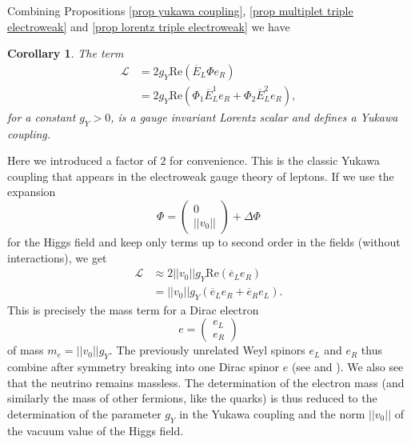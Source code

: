 \documentclass[12pt]{amsart}
\newtheorem{cor}[thm]{Corollary}
\theoremstyle{definition}
\theoremstyle{remark}
\numberwithin{equation}{section}
\begin{document}
Combining Propositions \ref{prop yukawa coupling}, \ref{prop multiplet triple electroweak} and \ref{prop lorentz triple electroweak} we have
\begin{cor}The term
\begin{align*}
\mathcal{L}&=2 g_Y\mathrm{Re}(\overline{E}_L\Phi e_R)\\
&=2g_Y\mathrm{Re}(\Phi_1\overline{E}^1_Le_R+\Phi_2\overline{E}^2_Le_R),
\end{align*}
for a constant $g_Y>0$, is a gauge invariant Lorentz scalar and defines a Yukawa coupling.
\end{cor}
Here we introduced a factor of $2$ for convenience. This is the classic Yukawa coupling that appears in the electroweak gauge theory of leptons. If we use the expansion
\begin{equation*}
\Phi=\left(\begin{array}{c} 0 \\ ||v_0|| \end{array}\right)+\Delta\Phi
\end{equation*}
for the Higgs field and keep only terms up to second order in the fields (without interactions), we get
\begin{align*}
\mathcal{L}&\approx 2||v_0||g_Y\mathrm{Re}(\overline{e}_Le_R)\\
&=||v_0||g_Y(\overline{e}_Le_R+\overline{e}_Re_L).
\end{align*}
This is precisely the mass term for a Dirac electron 
\begin{equation*}
e=\left(\begin{array}{c}e_L\\ e_R\end{array}\right)
\end{equation*}
of mass $m_e=||v_0||g_Y$. The previously unrelated Weyl spinors $e_L$ and $e_R$ thus combine after symmetry breaking into one Dirac spinor $e$ (see \cite{Robinson} and \cite{Srednicki}). We also see that the neutrino remains massless. The determination of the electron mass (and similarly the mass of other fermions, like the quarks) is thus reduced to the determination of the parameter $g_Y$ in the Yukawa coupling and the norm $||v_0||$ of the vacuum value of the Higgs field.
\end{document}
